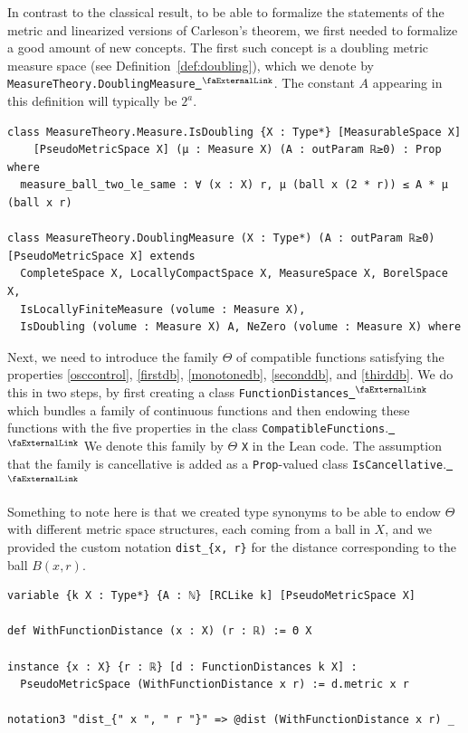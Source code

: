 \documentclass[12pt, reqno]{amsart}
\newcounter{lstlisting}[section]
\let\lean\lstinline
\newcommand{\extlink}{~\ensuremath{{}^\text{\faExternalLink}}}
\theoremstyle{definition}
\theoremstyle{plain}
\newcommand{\Mf}{{\Theta}}
\begin{document}
In contrast to the classical result, to be able to formalize the statements of the metric and linearized versions of Carleson's theorem, we first needed to formalize a good amount of new concepts.
The first such concept is a doubling metric measure space (see Definition~\ref{def:doubling}), which we denote by \lean{MeasureTheory.DoublingMeasure}\href{https://github.com/fpvandoorn/carleson/blob/AFM-frozen/Carleson/Defs.lean#L98-L102}{\extlink}. The constant $A$ appearing in this definition will typically be $2^a$.
\begin{lstlisting}[mathescape]
class MeasureTheory.Measure.IsDoubling {X : Type*} [MeasurableSpace X]
    [PseudoMetricSpace X] (μ : Measure X) (A : outParam ℝ≥0) : Prop where
  measure_ball_two_le_same : ∀ (x : X) r, μ (ball x (2 * r)) ≤ A * μ (ball x r)

class MeasureTheory.DoublingMeasure (X : Type*) (A : outParam ℝ≥0) [PseudoMetricSpace X] extends
  CompleteSpace X, LocallyCompactSpace X, MeasureSpace X, BorelSpace X,
  IsLocallyFiniteMeasure (volume : Measure X),
  IsDoubling (volume : Measure X) A, NeZero (volume : Measure X) where
\end{lstlisting}

Next, we need to introduce the family $\Mf$ of compatible functions satisfying the properties \eqref{osccontrol}, \eqref{firstdb}, \eqref{monotonedb}, \eqref{seconddb}, and \eqref{thirddb}. We do this in two steps, by first creating a class
\lean{FunctionDistances}\href{https://github.com/fpvandoorn/carleson/blob/AFM-frozen/Carleson/Defs.lean#L113-L121}{\extlink} which bundles a family of continuous functions and then endowing these functions with the five properties in the class \lean{CompatibleFunctions}.\href{https://github.com/fpvandoorn/carleson/blob/AFM-frozen/Carleson/Defs.lean#L167-L185}{\extlink} We denote this family by $\Theta$ \lean{X} in the Lean code. The assumption that the family is cancellative is added as a \lean{Prop}-valued class \lean{IsCancellative}.\href{https://github.com/fpvandoorn/carleson/blob/AFM-frozen/Carleson/Defs.lean#L191-L197}{\extlink}

Something to note here is that we created type synonyms to be able to endow $\Mf$ with different metric space structures, each coming from a ball in $X$, and we provided the custom notation \lean|dist_{x, r}| for the distance corresponding to the ball $B(x, r)$.

\begin{lstlisting}[mathescape]
variable {k X : Type*} {A : ℕ} [RCLike k] [PseudoMetricSpace X]

def WithFunctionDistance (x : X) (r : ℝ) := Θ X

instance {x : X} {r : ℝ} [d : FunctionDistances k X] :
  PseudoMetricSpace (WithFunctionDistance x r) := d.metric x r

notation3 "dist_{" x ", " r "}" => @dist (WithFunctionDistance x r) _
\end{lstlisting}
\end{document}
